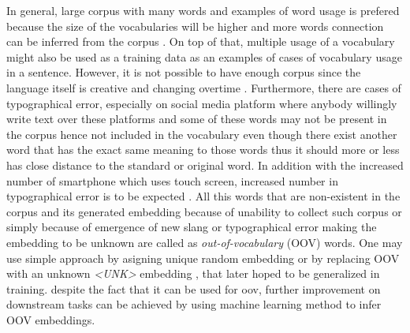     In general, large corpus with many words and examples of word
    usage is prefered because the size of the vocabularies will be
    higher and more words connection can be inferred from the corpus
    \citep{size2018kutuzov}. On top of that, multiple usage of a
    vocabulary might also be used as a training data as an examples of
    cases of vocabulary usage in a sentence. However, it is not
    possible to have enough corpus since the language itself is
    creative and changing overtime \citep{forrester2008abrief,
    speech2009Jurafsky:2009:SLP:1214993}. Furthermore, there are cases
    of typographical error, especially on social media platform where
    anybody willingly write text over these platforms
    \citep{Liu2010SentimentAA} and some of these words may not be
    present in the corpus hence not included in the vocabulary even
    though there exist another word that has the exact same meaning to
    those words thus it should more or less has close distance to the
    standard or original word\citep{mapping2012eisenstein}. In
    addition with the increased number of smartphone which uses touch
    screen, increased number in typographical error is to be expected
    \citep{ghosh2017correction}. All this words that are non-existent
    in the corpus and its generated embedding because of unability to
    collect such corpus or simply because of emergence of new slang or
    typographical error making the embedding to be unknown are called as
    \textit{out-of-vocabulary} (OOV) words. One may use simple
    approach by asigning unique random embedding or by replacing OOV
    with an unknown \textit{\textless UNK\textgreater} embedding
    \citep{predicting2019garneau}, that later hoped to be generalized
    in training. despite the fact that it can be used for oov, further
    improvement on downstream tasks can be achieved by using machine
    learning method to infer OOV embeddings.

